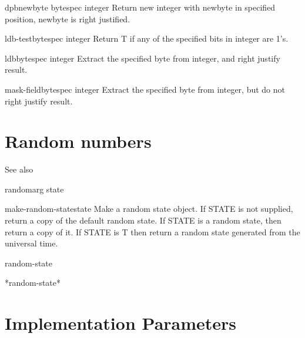 \begin{function}{dpb}{newbyte bytespec integer}{}{}
  Return new integer with newbyte in specified position, newbyte is right justified.
\end{function}

\begin{function}{ldb-test}{bytespec integer}{}{}
  Return T if any of the specified bits in integer are 1's.
\end{function}

\begin{accessor}{ldb}{bytespec integer}{}{}
  Extract the specified byte from integer, and right justify result.
\end{accessor}

\begin{accessor}{mask-field}{bytespec integer}{}{}
  Extract the specified byte from integer,  but do not right justify result.
\end{accessor}

\section{Random numbers}
\label{sec:random-numbers}

See also 

\begin{function}{random}{arg \op state}{}{}
  
\end{function}

\begin{function}{make-random-state}{\op state}{}{}
  Make a random state object. If STATE is not supplied, return a copy
  of the default random state. If STATE is a random state, then return a
  copy of it. If STATE is T then return a random state generated from
  the universal time.
\end{function}

\begin{class}{random-state}{}{}{}
  
\end{class}

\begin{variable}{*random-state*}{}{}{}
  
\end{variable}

\section{Implementation Parameters}
\label{sec:impl-param}

